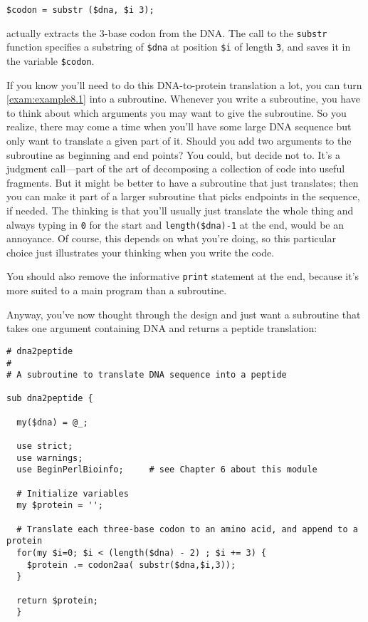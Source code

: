 \begin{lstlisting}
$codon = substr ($dna, $i 3);
\end{lstlisting}

actually extracts the 3-base codon from the DNA. The call to the \verb|substr| function specifies a substring of \verb|$dna| at position \verb|$i| of length \verb|3|, and saves it in the variable \verb|$codon|. 

If you know you'll need to do this DNA-to-protein translation a lot, you can turn \autoref{exam:example8.1} into a subroutine. Whenever you write a subroutine, you have to think about which arguments you may want to give the subroutine. So you realize, there may come a time when you'll have some large DNA sequence but only want to translate a given part of it. Should you add two arguments to the subroutine as beginning and end points? You could, but decide not to. It's a judgment call—part of the art of decomposing a collection of code into useful fragments. But it might be better to have a subroutine that just translates; then you can make it part of a larger subroutine that picks endpoints in the sequence, if needed. The thinking is that you'll usually just translate the whole thing and always typing in \verb|0| for the start and \verb|length($dna)-1| at the end, would be an annoyance. Of course, this depends on what you're doing, so this particular choice just illustrates your thinking when you write the code.

You should also remove the informative \verb|print| statement at the end, because it's more suited to a main program than a subroutine.

Anyway, you've now thought through the design and just want a subroutine that takes one argument containing DNA and returns a peptide translation: 

\begin{lstlisting}
# dna2peptide 
#
# A subroutine to translate DNA sequence into a peptide

sub dna2peptide {
  
  my($dna) = @_;

  use strict;
  use warnings;
  use BeginPerlBioinfo;     # see Chapter 6 about this module

  # Initialize variables
  my $protein = '';

  # Translate each three-base codon to an amino acid, and append to a protein 
  for(my $i=0; $i < (length($dna) - 2) ; $i += 3) {
    $protein .= codon2aa( substr($dna,$i,3));
  }

  return $protein;
  }
\end{lstlisting}

